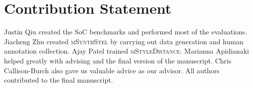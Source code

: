 \section * {Contribution Statement}

Justin Qiu created the SoC benchmarks and performed most of the evaluations. Jiacheng Zhu created \textsc{mSynthStel} by carrying out data generation and human annotation collection. Ajay Patel trained \textsc{mStyleDistance}. Marianna Apidianaki helped greatly with advising and the final version of the manuscript. Chris Callison-Burch also gave us valuable advice as our advisor. All authors contributed to the final manuscript. 